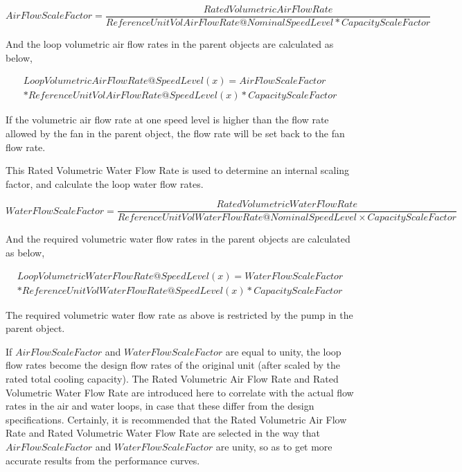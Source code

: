 {\scriptsize
\begin{equation}
  AirFlowScaleFactor = \frac{RatedVolumetricAirFlowRate}{ReferenceUnitVolAirFlowRate@NominalSpeedLevel * CapacityScaleFactor}
\end{equation}}

And the loop volumetric air flow rates in the parent objects are calculated as below,

\begin{equation}
\begin{split}
  LoopVolumetricAirFlowRate@SpeedLevel\left( x \right) = AirFlowScaleFactor \\
  * ReferenceUnitVolAirFlowRate@SpeedLevel(x) * CapacityScaleFactor
\end{split}
\end{equation}

If the volumetric air flow rate at one speed level is higher than the flow rate allowed by the fan in the parent object, the flow rate will be set back to the fan flow rate.

This Rated Volumetric Water Flow Rate is used to determine an internal scaling factor, and calculate the loop water flow rates.

{\scriptsize
\begin{equation}
  WaterFlowScaleFactor = \frac{{RatedVolumetricWaterFlowRate}}{{ReferenceUnitVolWaterFlowRate@NominalSpeedLevel \times CapacityScaleFactor}}
\end{equation}}

And the required volumetric water flow rates in the parent objects are calculated as below,

\begin{equation}
\begin{split}
  LoopVolumetricWaterFlowRate@SpeedLevel\left( x \right) = WaterFlowScaleFactor \\
  * ReferenceUnitVolWaterFlowRate@SpeedLevel(x) * CapacityScaleFactor
\end{split}
\end{equation}

The required volumetric water flow rate as above is restricted by the pump in the parent object.

If \(AirFlowScaleFactor\) and \(WaterFlowScaleFactor\) are equal to unity, the loop flow rates become the design flow rates of the original unit (after scaled by the rated total cooling capacity). The Rated Volumetric Air Flow Rate and Rated Volumetric Water Flow Rate are introduced here to correlate with the actual flow rates in the air and water loops, in case that these differ from the design specifications. Certainly, it is recommended that the Rated Volumetric Air Flow Rate and Rated Volumetric Water Flow Rate are selected in the way that \(AirFlowScaleFactor\) and \(WaterFlowScaleFactor\) are unity, so as to get more accurate results from the performance curves.

